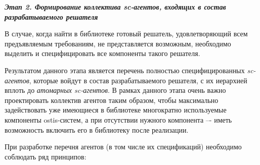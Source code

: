 \textbf{\textit{Этап 2. Формирование коллектива sc-агентов, входящих в состав разрабатываемого решателя}}

В случае, когда найти в библиотеке готовый решатель, удовлетворяющий всем предъявляемым требованиям, не представляется возможным, необходимо выделить и специфицировать все компоненты такого решателя.

Результатом данного этапа является перечень полностью специфицированных \textit{sc-агентов}, которые войдут в состав разрабатываемого решателя, с их иерархией вплоть до \textit{атомарных sc-агентов}. В рамках данного этапа очень важно проектировать коллектив агентов таким образом, чтобы максимально задействовать уже имеющиеся в библиотеке многократно используемые компоненты ostis-систем, а при отсутствии нужного компонента –- иметь возможность включить его в библиотеку после реализации.

При разработке перечня агентов (в том числе их спецификаций) необходимо соблюдать ряд принципов:

